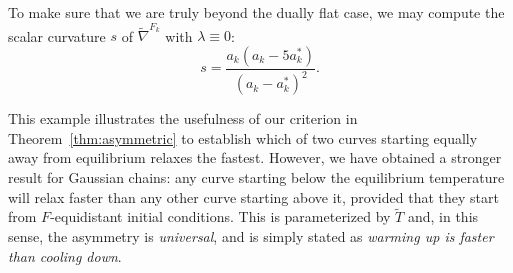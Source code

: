 \documentclass{amsart}
\theoremstyle{definition}
\begin{document}
To make sure that we are truly beyond the dually flat case, 
we may compute the scalar curvature $s$ of $\tilde\nabla^{F_k}$ with $\lambda\equiv0$:
\begin{equation*}
    s=\frac{a_k (a_k-5 a_k^*)}{(a_k-a_k^*)^2}.
\end{equation*}




This example illustrates the usefulness of our criterion in Theorem~\ref{thm:asymmetric} 
to establish which of two curves starting equally away from equilibrium relaxes the fastest.
However, we have obtained a stronger result for Gaussian chains: 
any curve starting below the equilibrium temperature will relax faster 
than any other curve starting above it,
provided that they start from $F$-equidistant initial conditions. 
This is parameterized by $\tilde T$ and, in this sense, the asymmetry is \textit{universal},
and is simply stated as \textit{warming up is faster than cooling down}.


\end{document}

